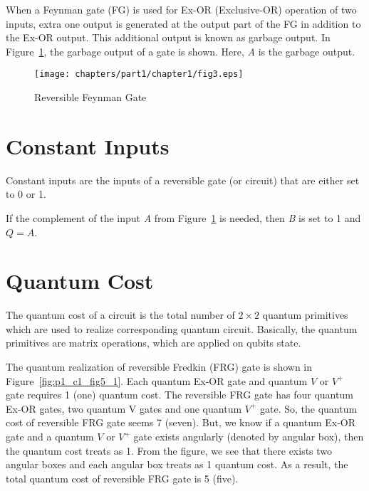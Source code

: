 
\begin{example}\textnormal{
	When a Feynman gate (FG) is used for Ex-OR (Exclusive-OR) operation of two inputs, extra one output is generated at the output part of the FG in addition to the Ex-OR output. This additional output is known as garbage output. In Figure~\ref{fig:p1_c1_fig3}, the garbage output of a gate is shown. Here, \textit{A} is the garbage output.}
\end{example}

\begin{figure}[H]
	\centering
	\texttt{[image: chapters/part1/chapter1/fig3.eps]}
	\caption{Reversible Feynman Gate}
	\label{fig:p1_c1_fig3}
\end{figure}

\section{Constant Inputs}
Constant inputs are the inputs of a reversible gate (or circuit) that are either set to 0 or 1.

\begin{example}\textnormal{
	If the complement of the input \textit{A} from Figure~\ref{fig:p1_c1_fig3} is needed, then \textit{B} is set to 1 and $Q = A$.}
\end{example}

\section{Quantum Cost}
The quantum cost of a circuit is the total number of $2 \times 2$ quantum primitives which are used to realize corresponding quantum circuit. Basically, the quantum primitives are matrix operations, which are applied on qubits state.%




\begin{example}\textnormal{
The quantum realization of reversible Fredkin (FRG) gate is shown in  Figure~\ref{fig:p1_c1_fig5_1}. Each quantum Ex-OR gate and quantum $V$ or $V^+$ gate requires 1 (one) quantum cost. The reversible FRG gate has four quantum Ex-OR gates, two quantum V gates and one quantum $V^+$ gate. So, the quantum cost of reversible FRG gate seems 7 (seven). But, we know if a quantum Ex-OR gate and a quantum $V$ or  $V^+$ gate exists angularly (denoted by angular  box), then the  quantum cost treats as 1. From the figure, we see that there exists two angular boxes and each angular box treats as 1 quantum cost. As a result, the total quantum cost of reversible FRG gate is 5 (five).}
\end{example}

